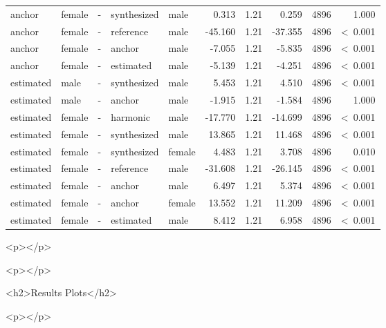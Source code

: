 \documentclass[a4paper,man,hidelinks,floatsintext]{apa7}
\begin{document}
\begin{table}[!htbp]
\begin{adjustbox}{max size={\columnwidth}{\textheight}}
\begin{tabular}{llrllrrrrr}
anchor      & female & - & synthesized & male   &      0.313 & 1.21 &   0.259 & 4896 &            1.000 \\
anchor      & female & - & reference   & male   &    -45.160 & 1.21 & -37.355 & 4896 &  \textless~0.001 \\
anchor      & female & - & anchor      & male   &     -7.055 & 1.21 &  -5.835 & 4896 &  \textless~0.001 \\
anchor      & female & - & estimated   & male   &     -5.139 & 1.21 &  -4.251 & 4896 &  \textless~0.001 \\
estimated   & male   & - & synthesized & male   &      5.453 & 1.21 &   4.510 & 4896 &  \textless~0.001 \\
estimated   & male   & - & anchor      & male   &     -1.915 & 1.21 &  -1.584 & 4896 &            1.000 \\
estimated   & female & - & harmonic    & male   &    -17.770 & 1.21 & -14.699 & 4896 &  \textless~0.001 \\
estimated   & female & - & synthesized & male   &     13.865 & 1.21 &  11.468 & 4896 &  \textless~0.001 \\
estimated   & female & - & synthesized & female &      4.483 & 1.21 &   3.708 & 4896 &            0.010 \\
estimated   & female & - & reference   & male   &    -31.608 & 1.21 & -26.145 & 4896 &  \textless~0.001 \\
estimated   & female & - & anchor      & male   &      6.497 & 1.21 &   5.374 & 4896 &  \textless~0.001 \\
estimated   & female & - & anchor      & female &     13.552 & 1.21 &  11.209 & 4896 &  \textless~0.001 \\
estimated   & female & - & estimated   & male   &      8.412 & 1.21 &   6.958 & 4896 &  \textless~0.001 \\
\hline
\end{tabular}
\end{adjustbox}
\begin{tablenotes} {
\small
}
\end{tablenotes}
\end{table}
      
        <p></p>
      
    
      
      
    
      
        <p></p>
      
    <h2>Results Plots</h2>
      
        <p></p>
      
\end{document}
